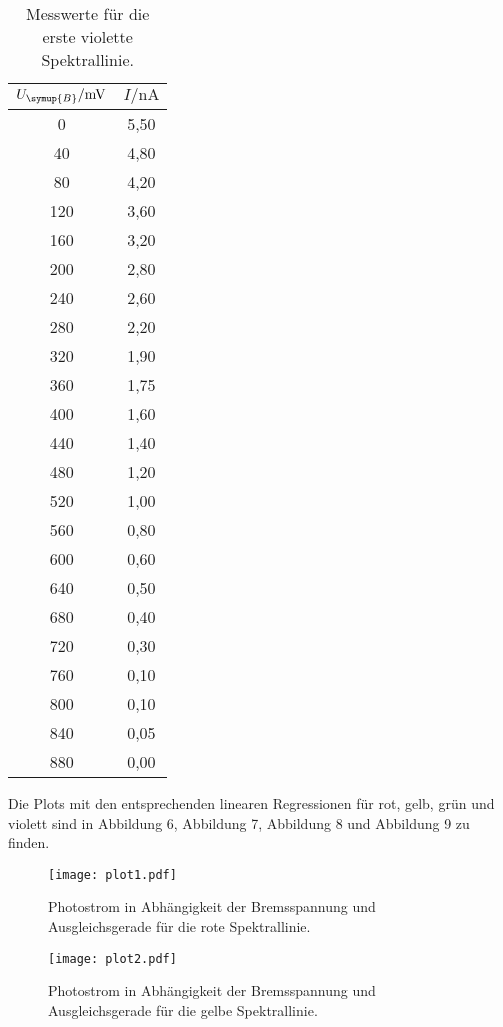 \begin{table}[H]
    \centering
    \caption{Messwerte für die erste violette Spektrallinie.}
    \label{tab:violett1}
    \begin{tabular}{c c}
        \toprule
        $U_{\symup{B}} / \unit{\milli\volt}$ & $I / \unit{\nano\ampere}$ \\
        \midrule
          0 & 5,50 \\
         40 & 4,80 \\
         80 & 4,20 \\
        120 & 3,60 \\
        160 & 3,20 \\
        200 & 2,80 \\
        240 & 2,60 \\
        280 & 2,20 \\
        320 & 1,90 \\
        360 & 1,75 \\
        400 & 1,60 \\
        440 & 1,40 \\
        480 & 1,20 \\
        520 & 1,00 \\
        560 & 0,80 \\
        600 & 0,60 \\
        640 & 0,50 \\
        680 & 0,40 \\
        720 & 0,30 \\
        760 & 0,10 \\
        800 & 0,10 \\
        840 & 0,05 \\
        880 & 0,00 \\
        \bottomrule
    \end{tabular}
\end{table}

Die Plots mit den entsprechenden linearen Regressionen für rot, gelb, grün und violett sind in Abbildung 6,
Abbildung 7, Abbildung 8 und Abbildung 9 zu finden.
\begin{figure}[H]
    \centering
    \label{fig:rot}
    \caption{Photostrom in Abhängigkeit der Bremsspannung und Ausgleichsgerade für die rote Spektrallinie.}
    \texttt{[image: plot1.pdf]}
\end{figure}

\begin{figure}[H]
    \centering
    \label{fig:gelb}
    \caption{Photostrom in Abhängigkeit der Bremsspannung und Ausgleichsgerade für die gelbe Spektrallinie.}
    \texttt{[image: plot2.pdf]}
\end{figure}


